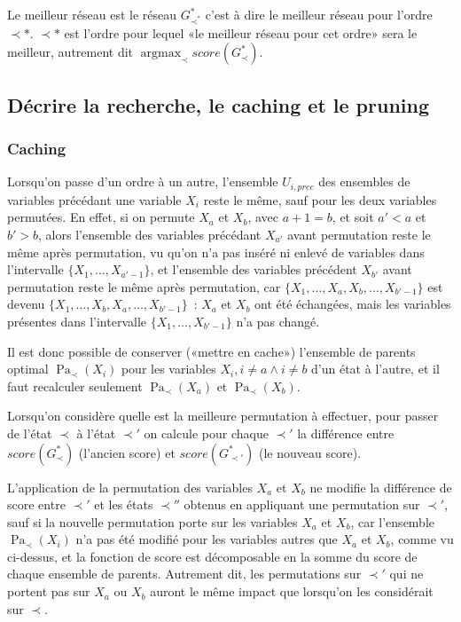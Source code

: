 \documentclass[french,a4paper]{article}
\DeclareMathOperator{\Pa}{Pa}
\DeclareMathOperator{\argmax}{argmax}
\begin{document}
Le meilleur réseau est le réseau $G^*_{\prec^*}$ c'est à dire le
meilleur réseau pour l'ordre $\prec*$. $\prec*$ est l'ordre pour
lequel «le meilleur réseau pour cet ordre» sera le meilleur, autrement
dit $\argmax_{\prec} score(G^*_\prec)$.

\subsection{Décrire la recherche, le caching et le pruning}

\subsubsection{Caching}

Lorsqu'on passe d'un ordre à un autre, l'ensemble $U_{i,prec}$ des
ensembles de variables précédant une variable $X_i$ reste le même,
sauf pour les deux variables permutées. En effet, si on permute $X_a$
et $X_b$, avec $a + 1 = b$, et soit $a' < a$ et $b' > b$, alors
l'ensemble des variables précédant $X_{a'}$ avant permutation reste le
même après permutation, vu qu'on n'a pas inséré ni enlevé de variables
dans l'intervalle $\{X_1, \dots, X_{a'-1}\}$, et l'ensemble des
variables précédent $X_{b'}$ avant permutation reste le même après
permutation, car $\{X_1, \dots, X_{a}, X_{b}, \dots, X_{b'-1}\}$ est
devenu $\{X_1, \dots, X_{b}, X_{a}, \dots, X_{b'-1}\}$~: $X_a$ et
$X_b$ ont été échangées, mais les variables présentes dans
l'intervalle $\{X_1, \dots, X_{b'-1}\}$ n'a pas changé.

Il est donc possible de conserver («mettre en cache») l'ensemble de
parents optimal $\Pa_\prec(X_i)$ pour les variables $X_i, i \neq a
\wedge i \neq b$ d'un état à l'autre, et il faut recalculer seulement
$\Pa_\prec(X_a)$ et $\Pa_\prec(X_b)$.

Lorsqu'on considère quelle est la meilleure permutation à effectuer,
pour passer de l'état $\prec$ à l'état $\prec'$ on calcule pour chaque
$\prec'$ la différence entre $score(G^*_\prec)$ (l'ancien score) et
$score(G^*_{\prec'})$ (le nouveau score).

L'application de la permutation des variables $X_a$ et $X_b$ ne
modifie la différence de score entre $\prec'$ et les états $\prec''$
obtenus en appliquant une permutation sur $\prec'$, sauf si la
nouvelle permutation porte sur les variables $X_a$ et $X_b$, car
l'ensemble $\Pa_\prec(X_i)$ n'a pas été modifié pour les variables
autres que $X_a$ et $X_b$, comme vu ci-dessus, et la fonction de score
est décomposable en la somme du score de chaque ensemble de
parents. Autrement dit, les permutations sur $\prec'$ qui ne portent
pas sur $X_a$ ou $X_b$ auront le même impact que lorsqu'on les
considérait sur $\prec$.
\end{document}
